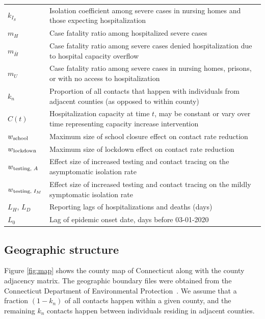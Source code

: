 \documentclass[11pt]{article}
\begin{document}
\begin{table}[!htb]
\begin{tabular}{p{} p{} }
	$k_{I_S}$ & Isolation coefficient among severe cases in nursing homes and those expecting hospitalization \\[0.5em]
	$m_H$ & Case fatality ratio among hospitalized severe cases \\[0.5em]
	$m_{\bar{H}}$ & Case fatality ratio among severe cases denied hospitalization due to hospital capacity overflow \\[0.5em]
	$m_{U}$ & Case fatality ratio among severe cases in nursing homes, prisons, or with no access to hospitalization \\[0.5em]
	$k_n$ & Proportion of all contacts that happen with individuals from adjacent counties (as opposed to within county) \\[0.5em]
	$C(t)$ & Hospitalization capacity at time $t$, may be constant or vary over time representing capacity increase intervention \\[0.5em]
	$w\textsubscript{school}$ & Maximum size of school closure effect on contact rate reduction \\[0.5em]
	$w\textsubscript{lockdown}$ & Maximum size of lockdown effect on contact rate reduction \\[0.5em]
	$w\textsubscript{testing, $A$}$ & Effect size of increased testing and contact tracing on the asymptomatic isolation rate  \\[0.5em]
	$w\textsubscript{testing, $I_M$}$ & Effect size of increased testing and contact tracing on the mildly symptomatic isolation rate \\[0.5em]
	$L_H$, $L_D$ & Reporting lags of hospitalizations and deaths (days) \\[0.5em]
	$L_0$ & Lag of epidemic onset date, days before 03-01-2020 \\[0.5em]
	\bottomrule
	\end{tabular}
	\label{table:params}
\end{table}
\endgroup

\subsection{Geographic structure}

Figure \ref{fig:map} shows the county map of Connecticut along with the county adjacency matrix. The geographic boundary files were obtained from the Connecticut Department of Environmental Protection~\citep{shapefile}. We assume that a fraction $(1-k_n)$ of all contacts happen within a given county, and the remaining $k_n$ contacts happen between individuals residing in adjacent counties.
\end{document}
